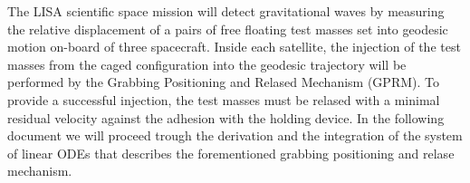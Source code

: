 The LISA scientific space mission will detect gravitational waves by measuring the relative displacement of a pairs of free floating test masses set into geodesic motion on-board of three spacecraft. Inside each satellite, the injection of the test masses from the caged configuration into the geodesic trajectory will be performed by the Grabbing Positioning and Relased Mechanism (GPRM). To provide a successful injection, the test masses must be relased with a minimal residual velocity against the adhesion with the holding device.
In the following document we will proceed trough the derivation and the integration of the system of linear ODEs that describes the forementioned grabbing positioning and relase mechanism.
